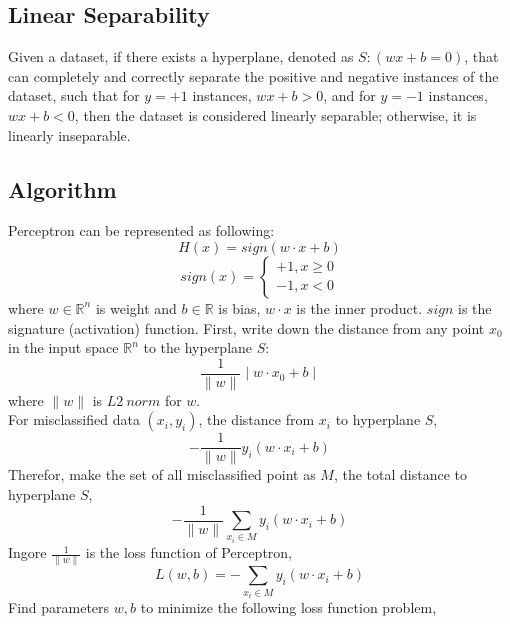 \documentclass[10pt,twocolumn,letterpaper]{article}
\begin{document}
\subsection{Linear Separability}
Given a dataset, if there exists a hyperplane, denoted as $S:(wx+b=0)$, that can completely and correctly separate the positive and negative instances of the dataset, such that for $y=+1$ instances, $wx+b>0$, and for $y=-1$ instances, $wx+b<0$, then the dataset is considered linearly separable; otherwise, it is linearly inseparable.

\subsection{Algorithm}
Perceptron can be represented as following:
\begin{equation}
	H(x) = sign(w\cdot x+b)
\end{equation}
\begin{equation}
	sign(x) = \begin{cases}
		+1, x\geq0 \\
		-1, x<0
	\end{cases}
\end{equation}
where $w\in\mathbb{R}^n$ is weight and $b\in\mathbb{R}$ is bias, $w\cdot x$ is the inner product. $sign$ is the signature (activation) function.
\indent First, write down the distance from any point $x_0$ in the input space $\mathbb{R}^n$ to the hyperplane $S$:
\begin{equation}
	\frac{1}{\parallel w \parallel}	\mid w \cdot x_0 + b	\mid
\end{equation}
where $\parallel w \parallel$ is $L2\:norm$ for $w$.\\
\indent For misclassified data $(x_i,y_i)$, the distance from $x_i$ to hyperplane $S$,
\begin{equation}
	-\frac{1}{\parallel w \parallel}y_i(w \cdot x_i + b)
\end{equation}
\indent Therefor, make the set of all misclassified point as $M$, the total distance to hyperplane $S$,
\begin{equation}
	-\frac{1}{\parallel w \parallel}\sum_{x_i \in M}{}y_i(w \cdot x_i + b)
\end{equation}
\indent Ingore $\frac{1}{\parallel w \parallel}$ is the loss function of Perceptron,
\begin{equation}
	L(w,b)=-\sum_{x_i \in M}{}y_i(w \cdot x_i + b)
\end{equation}
\indent Find parameters $w,b$ to minimize the following loss function problem,
\end{document}
